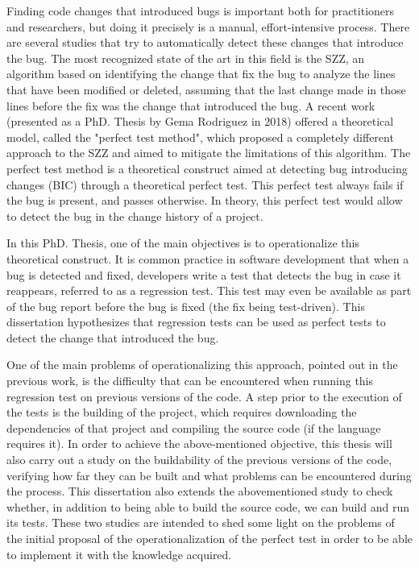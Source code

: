 Finding code changes that introduced bugs is important both for practitioners and researchers, but doing it precisely is a manual, effort-intensive process.
There are several studies that try to automatically detect these changes that introduce the bug. 
The most recognized state of the art in this field is the SZZ, an algorithm based on identifying the change that fix the bug to analyze the lines that have been modified or deleted, assuming that the last change made in those lines before the fix was the change that introduced the bug. 
A recent work (presented as a PhD. Thesis by Gema Rodriguez in 2018) offered a theoretical model, called the "perfect test method", which proposed a completely different approach to the SZZ and aimed to mitigate the limitations of this algorithm. 
The perfect test method is a theoretical construct aimed at detecting bug introducing changes (BIC) through a theoretical perfect test. This perfect test always fails if the bug is present, and passes otherwise.
In theory, this perfect test would allow to detect the bug in the change history of a project.

In this PhD. Thesis, one of the main objectives is to operationalize this theoretical construct.
It is common practice in software development that when a bug is detected and fixed, developers write a test that detects the bug in case it reappears, referred to as a regression test. 
This test may even be available as part of the bug report before the bug is fixed (the fix being test-driven). 
This dissertation hypothesizes that regression tests can be used as perfect tests to detect the change that introduced the bug. 

One of the main problems of operationalizing this approach, pointed out in the previous work, is the difficulty that can be encountered when running this regression test on previous versions of the code. 
A step prior to the execution of the tests is the building of the project, which requires downloading the dependencies of that project and compiling the source code (if the language requires it). 
In order to achieve the above-mentioned objective, this thesis will also carry out a study on the buildability of the previous versions of the code, verifying how far they can be built and what problems can be encountered during the process.
This dissertation also extends the abovementioned study to check whether, in addition to being able to build the source code, we can build and run its tests. 
These two studies are intended to shed some light on the problems of the initial proposal of the operationalization of the perfect test in order to be able to implement it with the knowledge acquired.

